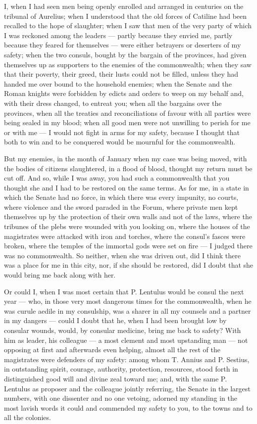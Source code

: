  I, when I had seen men being openly enrolled and arranged in centuries on the tribunal of Aurelius; when I understood that the old forces of Catiline had been recalled to the hope of slaughter; when I saw that men of the very party of which I was reckoned among the leaders --- partly because they envied me, partly because they feared for themselves --- were either betrayers or deserters of my safety; when the two consuls, bought by the bargain of the provinces, had given themselves up as supporters to the enemies of the commonwealth; when they saw that their poverty, their greed, their lusts could not be filled, unless they had handed me over bound to the household enemies; when the Senate and the Roman knights were forbidden by edicts and orders to weep on my behalf and, with their dress changed, to entreat you; when all the bargains over the provinces, when all the treaties and reconciliations of favour with all parties were being sealed in my blood; when all good men were not unwilling to perish for me or with me --- I would not fight in arms for my safety, because I thought that both to win and to be conquered would be mournful for the commonwealth.

 But my enemies, in the month of January when my case was being moved, with the bodies of citizens slaughtered, in a flood of blood, thought my return must be cut off. And so, while I was away, you had such a commonwealth that you thought she and I had to be restored on the same terms. As for me, in a state in which the Senate had no force, in which there was every impunity, no courts, where violence and the sword paraded in the Forum, where private men kept themselves up by the protection of their own walls and not of the laws, where the tribunes of the plebs were wounded with you looking on, where the houses of the magistrates were attacked with iron and torches, where the consul's fasces were broken, where the temples of the immortal gods were set on fire --- I judged there was no commonwealth. So neither, when she was driven out, did I think there was a place for me in this city, nor, if she should be restored, did I doubt that she would bring me back along with her.

 Or could I, when I was most certain that P. Lentulus would be consul the next year --- who, in those very most dangerous times for the commonwealth, when he was curule aedile in my consulship, was a sharer in all my counsels and a partner in my dangers --- could I doubt that he, when I had been brought low by consular wounds, would, by consular medicine, bring me back to safety? With him as leader, his colleague --- a most clement and most upstanding man --- not opposing at first and afterwards even helping, almost all the rest of the magistrates were defenders of my safety: among whom T. Annius and P. Sestius, in outstanding spirit, courage, authority, protection, resources, stood forth in distinguished good will and divine zeal toward me; and, with the same P. Lentulus as proposer and the colleague jointly referring, the Senate in the largest numbers, with one dissenter and no one vetoing, adorned my standing in the most lavish words it could and commended my safety to you, to the towns and to all the colonies.

